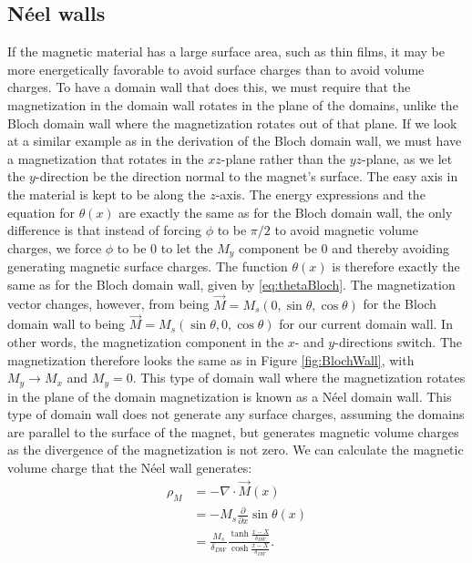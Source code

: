 \documentclass[12pt, a4paper]{article}		%
\numberwithin{equation}{section}
\begin{document}
\subsection{N\'{e}el walls}
If the magnetic material has a large surface area, such as thin films, it may be more energetically favorable to avoid surface charges than to avoid volume charges. To have a domain wall that does this, we must require that the magnetization in the domain wall rotates in the plane of the domains, unlike the Bloch domain wall where the magnetization rotates out of that plane. If we look at a similar example as in the derivation of the Bloch domain wall, we must have a magnetization that rotates in the $xz$-plane rather than the $yz$-plane, as we let the $y$-direction be the direction normal to the magnet's surface. The easy axis in the material is kept to be along the $z$-axis. The energy expressions and the equation for $\theta (x)$ are exactly the same as for the Bloch domain wall, the only difference is that instead of forcing $\phi$ to be $\pi/2$ to avoid magnetic volume charges, we force $\phi$ to be 0 to let the $M_y$ component be 0 and thereby avoiding generating magnetic surface charges. The function $\theta(x)$ is therefore exactly the same as for the Bloch domain wall, given by \eqref{eq:thetaBloch}. The magnetization vector changes, however, from being $\vec{M} = M_s(0, \sin\theta, \cos\theta)$ for the Bloch domain wall to being $\vec{M} = M_s(\sin\theta, 0, \cos\theta)$ for our current domain wall. In other words, the magnetization component in the $x$- and $y$-directions switch. The magnetization therefore looks the same as in Figure \ref{fig:BlochWall}, with $M_y \rightarrow M_x$ and $M_y=0$. This type of domain wall where the magnetization rotates in the plane of the domain magnetization is known as a N\'{e}el domain wall. This type of domain wall does not generate any surface charges, assuming the domains are parallel to the surface of the magnet, but generates magnetic volume charges as the divergence of the magnetization is not zero. We can calculate the magnetic volume charge that the N\'{e}el wall generates:
\begin{align}
\nonumber\rho_M &= -\nabla\cdot\vec{M}(x) \\
\nonumber&= -M_s \frac{\partial}{\partial x} \sin \theta(x) \\
&= \frac{M_s}{\delta_{DW}}\frac{\tanh\frac{x-X}{\delta_{DW}}}{\cosh\frac{x-X}{\delta_{DW}}}.
\end{align}
\end{document}
